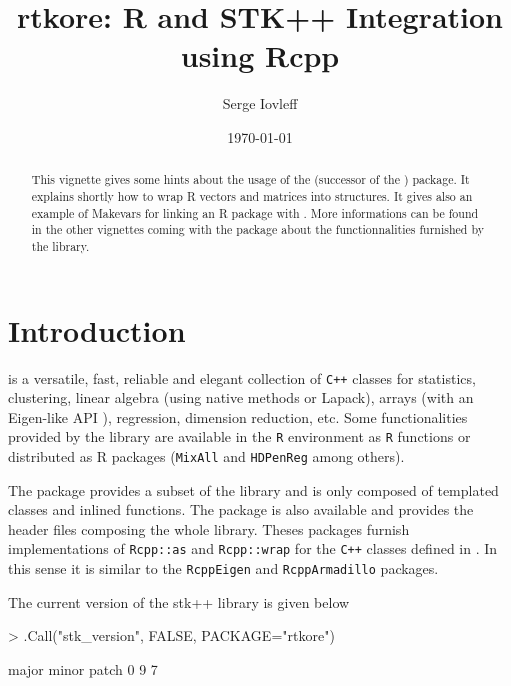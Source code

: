 \documentclass[a4paper,10pt]{article}
\title{ rtkore: R and STK++ Integration using Rcpp}
\author{Serge Iovleff}
\date{\today}
\begin{document}


\maketitle
\begin{abstract}
This vignette gives some hints about the usage of the \rtkore{} (successor of
the \rtkpp{}) package. It explains shortly how to wrap R vectors and matrices
into \stkpp{} structures. It gives also an example of Makevars for linking an R
package with \rtkore{}. More informations can be found in the other vignettes
coming with the package about the functionnalities furnished by the \stkpp{} library.
\end{abstract}

\section{Introduction}

\stkpp{} is a versatile, fast, reliable and elegant collection of \texttt{C++}
classes for statistics, clustering, linear algebra (using native methods or
Lapack\cite{Lapack}), arrays (with an Eigen-like API \cite{JSS:RcppEigen}),
regression, dimension reduction, etc. Some functionalities provided by the
library are available in the \texttt{R} environment as \texttt{R} functions or
distributed as R packages (\texttt{MixAll} \cite{MixAll} and \texttt{HDPenReg}
\cite{HDPenReg} among others).

The \rtkore{} package provides a subset of the \stkpp{}
library and is only composed of templated classes and inlined functions.
The \rtkpp{} package is also available and provides the header files composing
the whole \stkpp{} library. Theses packages furnish implementations of
\texttt{Rcpp::as} and \texttt{Rcpp::wrap} for the \texttt{C++} classes defined
in \stkpp{}. In this sense it is similar to the \texttt{RcppEigen}
\cite{CRAN:RcppEigen,JSS:RcppEigen} and \texttt{RcppArmadillo}
\cite{CRAN:RcppArmadillo} packages.

The current version of the stk++ library is given below
\begin{Schunk}
\begin{Sinput}
> .Call("stk_version", FALSE, PACKAGE="rtkore")
\end{Sinput}
\begin{Soutput}
major minor patch 
    0     9     7 
\end{Soutput}
\end{Schunk}
\end{document}
